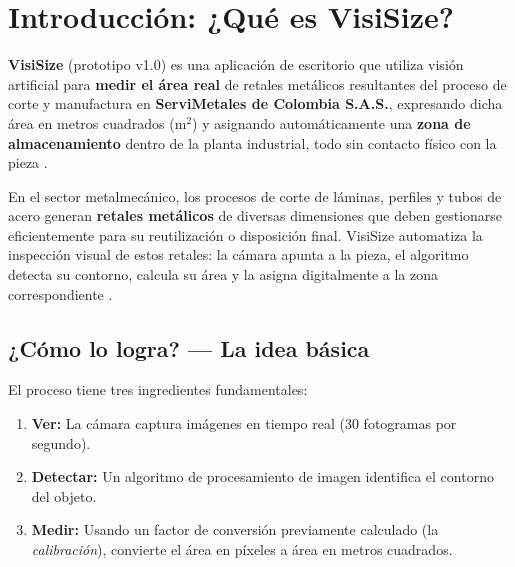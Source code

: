 \documentclass[12pt, a4paper]{article}
\begin{document}
\tableofcontents
\newpage

\section{Introducción: ¿Qué es VisiSize?}

\begin{infobox}[title={Concepto Central --- ServiMetales de Colombia S.A.S.}]
\textbf{VisiSize} (prototipo v1.0) es una aplicación de escritorio que utiliza
visión artificial para \textbf{medir el área real} de retales metálicos
resultantes del proceso de corte y manufactura en \textbf{ServiMetales de Colombia S.A.S.},
expresando dicha área en metros cuadrados ($\text{m}^2$) y asignando automáticamente
una \textbf{zona de almacenamiento} dentro de la planta industrial, todo sin contacto
físico con la pieza \cite{malamas2003}.
\end{infobox}

\vspace{0.5cm}

En el sector metalmecánico, los procesos de corte de láminas, perfiles y tubos de acero
generan \textbf{retales metálicos} de diversas dimensiones que deben gestionarse
eficientemente para su reutilización o disposición final. VisiSize automatiza la
inspección visual de estos retales: la cámara apunta a la pieza, el algoritmo detecta
su contorno, calcula su área y la asigna digitalmente a la zona correspondiente \cite{chin1982}.

\subsection{¿Cómo lo logra? --- La idea básica}

El proceso tiene tres ingredientes fundamentales:

\begin{enumerate}
  \item \textbf{Ver:} La cámara captura imágenes en tiempo real (30 fotogramas por segundo).
  \item \textbf{Detectar:} Un algoritmo de procesamiento de imagen identifica el contorno del objeto.
  \item \textbf{Medir:} Usando un factor de conversión previamente calculado (la \emph{calibración}),
        convierte el área en píxeles a área en metros cuadrados.
\end{enumerate}
\end{document}
